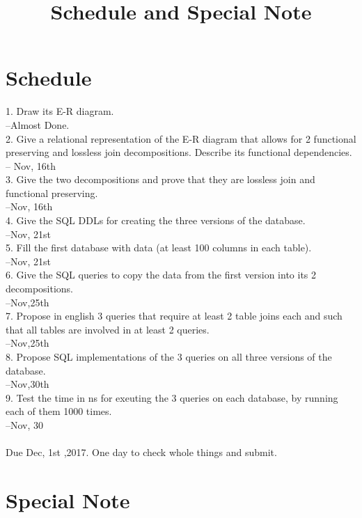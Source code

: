 \documentclass[12pt]{article}
\begin{document}
\title{Schedule and Special Note}
\maketitle

\section{Schedule}

1. Draw its E-R diagram.\\
	--Almost Done.\\
2. Give a relational representation of the E-R diagram that allows for 2 functional preserving and lossless join decompositions. Describe its functional dependencies.\\
	-- Nov, 16th\\
3. Give the two decompositions and prove that they are lossless join and functional preserving.\\
	--Nov, 16th\\
4. Give the SQL DDLs for creating the three versions of the database.\\
	--Nov, 21st\\
5. Fill the first database with data (at least 100 columns in each table).\\
	--Nov, 21st\\
6. Give the SQL queries to copy the data from the first version into its 2 decompositions.\\
	--Nov,25th\\
7. Propose in english 3 queries that require at least 2 table joins each and such that all tables are involved in at least 2 queries.\\
	--Nov,25th\\
8. Propose SQL implementations of the 3 queries on all three versions of the database.\\
	--Nov,30th\\
9. Test the time in ns for exeuting the 3 queries on each database, by running each of them 1000 times.\\
	--Nov, 30\\
\\
Due Dec, 1st ,2017. One day to check whole things and submit.

\section{Special Note}
\end{document}
